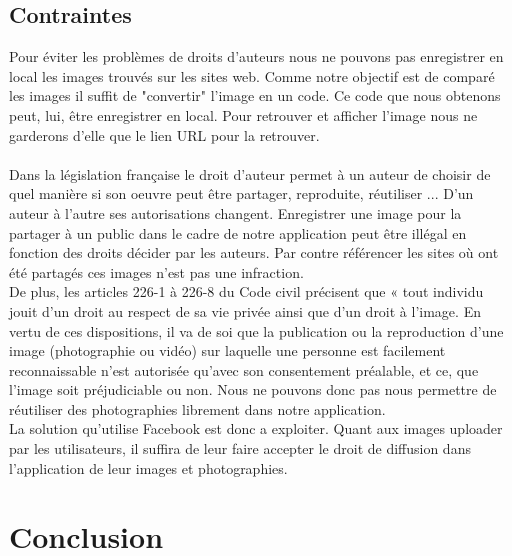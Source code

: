 \documentclass[a4paper,12pt]{article}
\begin{document}
\subsection{Contraintes}
Pour éviter les problèmes de droits d'auteurs nous ne pouvons pas enregistrer en local les images trouvés sur les sites web. Comme notre objectif est de comparé les images il suffit de "convertir" l'image en un code. Ce code que nous obtenons peut, lui, être enregistrer en local. Pour retrouver et afficher l'image nous ne garderons d'elle que le lien URL pour la retrouver. \\ \\
Dans la législation française le droit d'auteur permet à un auteur de choisir de quel manière si son oeuvre peut être partager, reproduite, réutiliser ... D'un auteur à l'autre ses autorisations changent. Enregistrer une image pour la partager à un public dans le cadre de notre application peut être illégal en fonction des droits décider par les auteurs. Par contre référencer les sites où ont été partagés ces images n'est pas une infraction. \\ 
De plus, les articles 226-1 à 226-8 du Code civil précisent que « tout individu jouit d’un droit au respect de sa vie privée ainsi que d’un droit à l’image. En vertu de ces dispositions, il va de soi que la publication ou la reproduction d’une image (photographie ou vidéo) sur laquelle une personne est facilement reconnaissable n’est autorisée qu’avec son consentement préalable, et ce, que l’image soit préjudiciable ou non. Nous ne pouvons donc pas nous permettre de réutiliser des photographies librement dans notre application. \\ 
La solution qu'utilise Facebook est donc a exploiter. Quant aux images uploader par les utilisateurs, il suffira de leur faire accepter le droit de diffusion dans l'application de leur images et photographies. 

\newpage
{}
\section*{Conclusion}


\newpage
\end{document}
